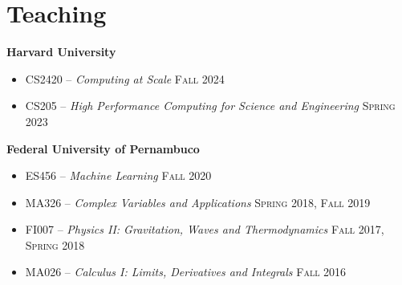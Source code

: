 \documentclass[letterpaper,10pt]{article}
\newcommand{\entry}[4]{

\begin{minipage}[t]{.15\textwidth}
\end{minipage}
\hfill\vline\hfill 
\begin{minipage}[t]{0.95\textwidth}
#2 \hfill \textsc{#1}

\textit{#3}

\footnotesize{#4}
\end{minipage}\\\vspace{.25cm}}
\newcommand{\harv}{Harvard University}
\newcommand{\ufpe}{Federal University of Pernambuco}
\newcommand{\mycomment}[1]{}
\begin{document}
\section{Teaching}
\textbf{\harv}
\vspace{-0.5em}
\begin{itemize}[label={}]
    \setlength\itemsep{0.1em}
	\item CS2420 -- \textit{Computing at Scale} \hfill\textsc{Fall 2024}
	\item CS205 -- \textit{High Performance Computing for Science and Engineering} \hfill\textsc{Spring 2023}
\end{itemize}
\hspace{1.5em}\textbf{\ufpe} 
\vspace{-0.5em}
\begin{itemize}[label={}]
    \setlength\itemsep{0.1em}
    \item ES456 -- \textit{Machine Learning} \hfill\textsc{Fall 2020}
    \item MA326 -- \textit{Complex Variables and Applications} \hfill\textsc{Spring 2018, Fall 2019}
    \item FI007 -- \textit{Physics II: Gravitation, Waves and Thermodynamics} \hfill\textsc{Fall 2017, Spring 2018}
    \item MA026 -- \textit{Calculus I: Limits, Derivatives and Integrals} \hfill\textsc{Fall 2016} 
\end{itemize}
\vspace*{-.25cm}
\mycomment{
\entry{Spring 2023}{CS205 -- \textbf{High Performance Computing} -- Teaching Fellow}{\harv}{
	I led lab activites, held office hours, assisted the teaching staff on grading assignments, and mentored some of the final projects.
	}

\entry{Fall 2020}{ES456 -- \textbf{Machine Learning} -- Teaching Assistant}{\ufpe}{
	I conducted my own activities and lectures off of my own syllabus. Supported the students developing projects and graded work.
	}

\entry{2018--2019}{MA326 -- \textbf{Complex Variables and Applications} -- Teaching Assistant}{\ufpe}{
	I taught once-a-week sessions to support students in their assignments.
	}

\entry{2017--2018}{FI007 -- \textbf{Physics II: Gravitation, Waves and Thermodynamics} -- Teaching Assistant}{\ufpe}{
	I wrote some extra assignments for students interested in Olympic-level Physics, as well as once-a-week sessions to discuss.
	}

\entry{Fall 2016}{MA026 -- \textbf{Calculus I: Limits, Derivatives and Integrals} -- Teaching Assistant}{\ufpe}{
	I taught once-a-week sessions to support students in their assignments.
	}
}
\end{document}
